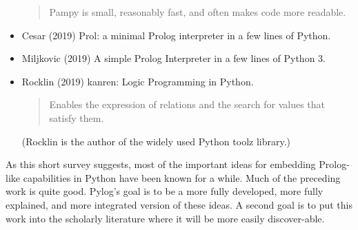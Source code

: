\begin{itemize}
\begin{quote}
    Pampy is small, reasonably fast, and often makes code more readable.
    \end{quote}
\item Cesar (2019) \cite{Cesar2019} Prol: a minimal Prolog interpreter in a few lines of Python. 
\item Miljkovic (2019)\cite{Miljkovic2019} A simple Prolog Interpreter in a few lines of Python 3.
\item Rocklin (2019) \cite{Rocklin2019} kanren: Logic Programming in Python.
    \begin{quote}
    Enables the expression of relations and the search for values that satisfy them. 
    \end{quote}
    (Rocklin is the author of the widely used Python toolz library.)
\end{itemize}

As this short survey suggests, most of the important ideas for embedding Prolog-like capabilities in Python have been known for a while. Much of the preceding work is quite good. Pylog's goal is to be a more fully developed, more fully explained, and more integrated version of these ideas. A second goal is to put this work into the scholarly literature where it will be more easily discover-able.
